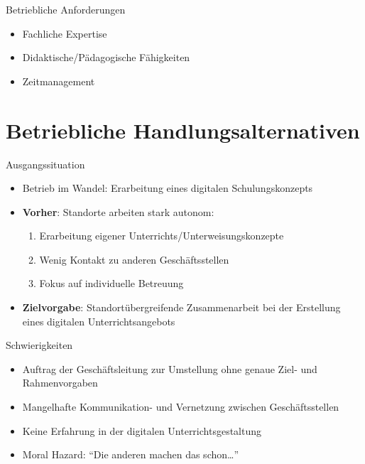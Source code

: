 \documentclass[
  10pt,
  ignorenonframetext,
]{beamer}
\providecommand{\tightlist}{%
  \setlength{\itemsep}{0pt}\setlength{\parskip}{0pt}}
\begin{document}
\begin{frame}{Betriebliche Anforderungen}
\protect\hypertarget{betriebliche-anforderungen}{}
\begin{itemize}
\tightlist
\item
  Fachliche Expertise
\item
  Didaktische/Pädagogische Fähigkeiten
\item
  Zeitmanagement
\end{itemize}
\end{frame}

\hypertarget{betriebliche-handlungsalternativen-1}{%
\section{Betriebliche
Handlungsalternativen}\label{betriebliche-handlungsalternativen-1}}

\begin{frame}{Ausgangssituation}
\protect\hypertarget{ausgangssituation}{}
\begin{itemize}
\tightlist
\item
  Betrieb im Wandel: Erarbeitung eines digitalen Schulungskonzepts
\item
  \textbf{Vorher}: Standorte arbeiten stark autonom:

  \begin{enumerate}
  \tightlist
  \item
    Erarbeitung eigener Unterrichts/Unterweisungskonzepte
  \item
    Wenig Kontakt zu anderen Geschäftsstellen
  \item
    Fokus auf individuelle Betreuung
  \end{enumerate}
\item
  \textbf{Zielvorgabe}: Standortübergreifende Zusammenarbeit bei der
  Erstellung eines digitalen Unterrichtsangebots
\end{itemize}
\end{frame}

\begin{frame}{Schwierigkeiten}
\protect\hypertarget{schwierigkeiten}{}
\begin{itemize}
\tightlist
\item
  Auftrag der Geschäftsleitung zur Umstellung ohne genaue Ziel- und
  Rahmenvorgaben
\item
  Mangelhafte Kommunikation- und Vernetzung zwischen Geschäftsstellen
\item
  Keine Erfahrung in der digitalen Unterrichtsgestaltung
\item
  Moral Hazard: ``Die anderen machen das schon\ldots{}''
\end{itemize}
\end{frame}
\end{document}
